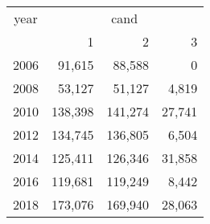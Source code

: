 \footnotesize\begin{tabular}[t]{lrrr}
\toprule
\multicolumn{1}{c}{year} & \multicolumn{3}{c}{cand} \\
\cmidrule(l{3pt}r{3pt}){1-1} \cmidrule(l{3pt}r{3pt}){2-4}
  & 1 & 2 & 3\\
\midrule
2006 & 91,615 & 88,588 & 0\\
2008 & 53,127 & 51,127 & 4,819\\
2010 & 138,398 & 141,274 & 27,741\\
2012 & 134,745 & 136,805 & 6,504\\
2014 & 125,411 & 126,346 & 31,858\\
2016 & 119,681 & 119,249 & 8,442\\
2018 & 173,076 & 169,940 & 28,063\\
\bottomrule
\end{tabular}

